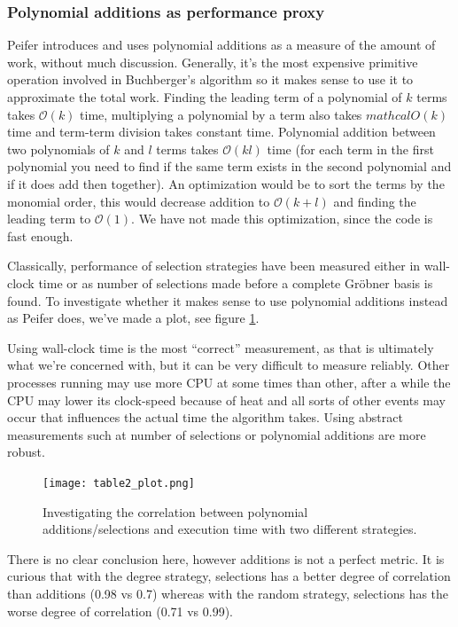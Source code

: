 \documentclass{article}
\theoremstyle{changedot}
\theoremstyle{changedotbreak}
\theoremstyle{nonumberplain}
\begin{document}
\subsubsection{Polynomial additions as performance proxy}
Peifer \cite{peifer} introduces and uses polynomial additions as a measure of the amount of work, without much discussion. Generally, it's the most expensive primitive operation involved in Buchberger's algorithm so it makes sense to use it to approximate the total work. Finding the leading term of a polynomial of $k$ terms takes $\mathcal O(k)$ time, multiplying a polynomial by a term also takes $mathcal O(k)$ time and term-term division takes constant time. Polynomial addition between two polynomials of $k$ and $l$ terms takes $\mathcal O(kl)$ time (for each term in the first polynomial you need to find if the same term exists in the second polynomial and if it does add then together). An optimization would be to sort the terms by the monomial order, this would decrease addition to $\mathcal O(k+l)$ and finding the leading term to $\mathcal O(1)$. We have not made this optimization, since the code is fast enough.

Classically, performance of selection strategies have been measured either in wall-clock time or as number of selections made before a complete Gröbner basis is found. To investigate whether it makes sense to use polynomial additions instead as Peifer does, we've made a plot, see figure \ref{fig:corr}.

Using wall-clock time is the most ``correct'' measurement, as that is ultimately what we're concerned with, but it can be very difficult to measure reliably. Other processes running may use more CPU at some times than other, after a while the CPU may lower its clock-speed because of heat and all sorts of other events may occur that influences the actual time the algorithm takes. Using abstract measurements such at number of selections or polynomial additions are more robust.

\begin{figure}[h!]
  \centering
  \texttt{[image: table2\_plot.png]}
  \caption{Investigating the correlation between polynomial additions/selections and execution time with two different strategies.}
  \label{fig:corr}
\end{figure}

There is no clear conclusion here, however additions is not a perfect metric. It is curious that with the degree strategy, selections has a better degree of correlation than additions (0.98 vs 0.7) whereas with the random strategy, selections has the worse degree of correlation (0.71 vs 0.99). 
\end{document}
